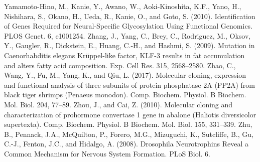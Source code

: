 Yamamoto-Hino, M., Kanie, Y., Awano, W., Aoki-Kinoshita, K.F., Yano, H., Nishihara, S., Okano, H., Ueda, R., Kanie, O., and Goto, S. (2010). Identification of Genes Required for Neural-Specific Glycosylation Using Functional Genomics. PLOS Genet. 6, e1001254.
Zhang, J., Yang, C., Brey, C., Rodriguez, M., Oksov, Y., Gaugler, R., Dickstein, E., Huang, C.-H., and Hashmi, S. (2009). Mutation in Caenorhabditis elegans Krüppel-like factor, KLF-3 results in fat accumulation and alters fatty acid composition. Exp. Cell Res. 315, 2568–2580.
Zhao, C., Wang, Y., Fu, M., Yang, K., and Qiu, L. (2017). Molecular cloning, expression and functional analysis of three subunits of protein phosphatase 2A (PP2A) from black tiger shrimps (Penaeus monodon). Comp. Biochem. Physiol. B Biochem. Mol. Biol. 204, 77–89.
Zhou, J., and Cai, Z. (2010). Molecular cloning and characterization of prohormone convertase 1 gene in abalone (Haliotis diversicolor supertexta). Comp. Biochem. Physiol. B Biochem. Mol. Biol. 155, 331–339.
Zhu, B., Pennack, J.A., McQuilton, P., Forero, M.G., Mizuguchi, K., Sutcliffe, B., Gu, C.-J., Fenton, J.C., and Hidalgo, A. (2008). Drosophila Neurotrophins Reveal a Common Mechanism for Nervous System Formation. PLoS Biol. 6.

